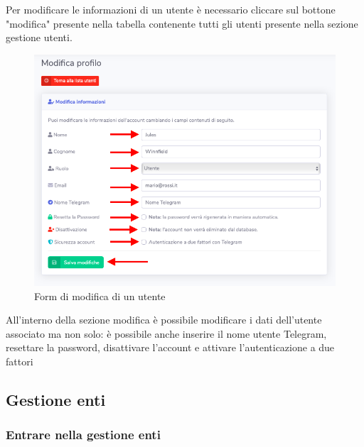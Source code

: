 		Per modificare le informazioni di un utente è necessario cliccare sul bottone "modifica" presente nella tabella contenente tutti gli utenti presente nella sezione gestione utenti.

		\begin{figure}[H]
		\centering
		\includegraphics[scale=0.600]{res/images/admin/modUtente.png}
		\caption{Form di modifica di un utente}
	\end{figure}

		All'interno della sezione modifica è possibile modificare i dati dell'utente associato ma non solo: è possibile anche inserire il nome utente Telegram, resettare la password, disattivare l'account e attivare l'autenticazione a due fattori

\subsection{Gestione enti}
	
	\subsubsection{Entrare nella gestione enti}

